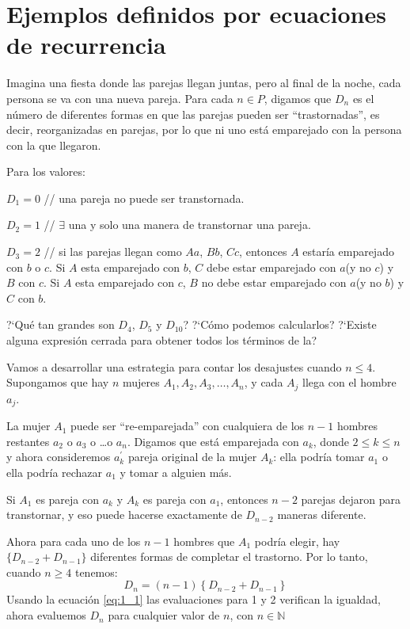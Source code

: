 \section{Ejemplos definidos por ecuaciones de recurrencia}
\begin{example}{}
	Imagina una fiesta donde las parejas llegan juntas, pero al final de la noche, cada persona se va con una nueva pareja. Para cada $n\in P$, digamos que $D_{n}$ es el número de diferentes formas en que las parejas pueden ser ``trastornadas'', es decir, reorganizadas en parejas, por lo que ni uno está emparejado con la persona con la que llegaron.

	Para los valores:

	$D_{1} = 0$  // una pareja no puede ser transtornada.

	$D_{2} = 1$  // $\exists$ una y solo una manera de transtornar una pareja.

	$D_{3} = 2$  // si las parejas llegan como $Aa$, $Bb$, $Cc$, entonces $A$ estaría emparejado con $b$ o $c$. Si $A$ esta emparejado con $b$, $C$ debe estar emparejado con $a$(y no $c$) y $B$ con $c$. Si $A$ esta emparejado con $c$, $B$ no debe estar emparejado con $a$(y no $b$) y $C$ con $b$.

	?`Qué tan grandes son $D_{4}$, $D_{5}$ y $D_{10}$? ?`Cómo podemos calcularlos? ?`Existe alguna expresión cerrada para obtener todos los términos de la? %

	Vamos a desarrollar una estrategia para contar los desajustes cuando $n\leq4$. Supongamos que hay $n$ mujeres $A_{1},A_{2},A_{3},\ldots,A_{n}$, y cada $A_{j}$ llega con el hombre $a_{j}$.

	La mujer $A_{1}$ puede ser ``re-emparejada'' con cualquiera de los $n-1$ hombres restantes $a_{2}$ o $a_{3}$ o \ldots o $a_{n}$. Digamos que está emparejada con $a_{k}$, donde $2\leq k\leq n$ y ahora consideremos $a_{k}^{\prime}$ pareja original de la mujer $A_{k}$: ella podría tomar $a_{1}$ o ella podría rechazar $a_{1}$ y tomar a alguien más.
	
	Si $A_{1}$ es pareja con $a_{k}$ y $A_{k}$ es pareja con $a_{1}$, entonces $n-2$ parejas dejaron para transtornar, y eso puede hacerse exactamente de $D_{n-2}$ maneras diferente.

	Ahora para cada uno de los $n-1$ hombres que $A_{1}$ podría elegir, hay $\{D_{n-2}+ D_{n-1}\}$ diferentes formas de completar el trastorno. Por lo tanto, cuando $n\geq 4$ tenemos:
\begin{equation*}\label{eq:1_1}
D_{n}=\left(n-1\right)\left\{D_{n-2}+D_{n-1}\right\}%
\end{equation*}
Usando la ecuación \eqref{eq:1_1} las evaluaciones para 1 y 2 verifican la igualdad, ahora evaluemos $D_{n}$ para cualquier valor de $n$, con $n\in\mathds{N}$


\end{example}
